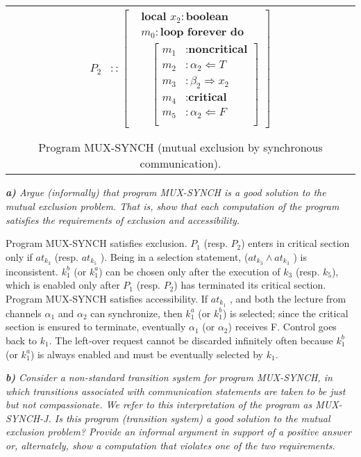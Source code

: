 \documentclass[12pt]{article}
\begin{document}
\begin{center}
\begin{tabular}{|c|}
{\begin{align*}
	P_2 &:: \left[ \begin{aligned}
		&\textbf{local } x_2: \textbf{boolean}\\
		&m_0: \textbf{loop forever do } \\ 
 		&\;\;\; \left[ \begin{aligned}
 				m_1 &: \textbf{noncritical}\\ 
 				m_2 &: \alpha_2 \Leftarrow T\\
 				m_3 &: \beta_2 \Rightarrow x_2\\
 				m_4 &: \textbf{critical}\\
 				m_5 &: \alpha_2 \Leftarrow F\\
			\end{aligned} \right]
		\end{aligned} \right]\\
\end{align*}} \\
Program MUX-SYNCH (mutual exclusion by synchronous communication). \\
\hline
\end{tabular}
\end{center}
\textit{\textbf{a)} Argue (informally) that program MUX-SYNCH is a good solution to the mutual exclusion problem. That is, show that each computation of the program satisfies the requirements of exclusion and accessibility.}

Program MUX-SYNCH satisfies exclusion. $P_1$ (resp. $P_2$) enters in critical section only if $at_{k_3}$ (resp. $at_{k_5}$ ). Being in a selection statement, ($at_{k_3} \land at_{k_3}$ ) is inconsistent. $k^{b}_{1}$ (or $k^{a}_{1}$) can be chosen only after the execution of $k_3$ (resp. $k_5$), which is enabled only after $P_1$ (resp. $P_2$) has terminated its critical section. Program MUX-SYNCH satisfies accessibility. If $at_{k_1}$ , and both the lecture from channels $\alpha_1$ and $\alpha_2$ can synchronize, then $k^{a}_{1}$ (or $k^{b}_{1}$) is selected; since the critical section is ensured to terminate, eventually $\alpha_1$ (or $\alpha_2$) receives F. Control goes back to $k_1$. The left-over request cannot be discarded infinitely often because $k^{b}_{1}$ (or $k^{a}_{1}$) is always enabled and must be eventually selected by $k_1$.

\medskip
\textit{\textbf{b)} Consider a non-standard transition system for program MUX-SYNCH, in which transitions associated with communication statements are taken to be just but not compassionate. We refer to this interpretation of the program as MUX-SYNCH-J. Is this program (transition system) a good solution to the mutual exclusion problem? Provide an informal argument in support of a positive answer or, alternately, show a computation that violates one of the two requirements.}
\end{document}
